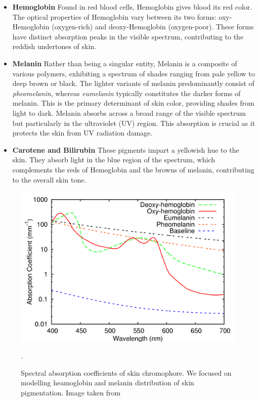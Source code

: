 \begin{spacing}{1.5}
\begin{itemize}
    \item \textbf{Hemoglobin} Found in red blood cells, Hemoglobin gives blood its red color. The optical properties of Hemoglobin vary between its two forms: oxy-Hemoglobin (oxygen-rich) and deoxy-Hemoglobin (oxygen-poor). These forms have distinct absorption peaks in the visible spectrum, contributing to the reddish undertones of skin.
    \item \textbf{Melanin} Rather than being a singular entity, Melanin is a composite of various polymers, exhibiting a spectrum of shades ranging from pale yellow to deep brown or black. The lighter variants of melanin predominantly consist of \textit{pheomelanin}, whereas \textit{eumelanin} typically constitutes the darker forms of melanin\cite{alalufEthnicVariationMelanin2002a}. This is the primary determinant of skin color\cite{doiSpectralEstimationHuman2003}, providing shades from light to dark. Melanin absorbs across a broad range of the visible spectrum but particularly in the ultraviolet (UV) region\cite{ANDERSON198113}. This absorption is crucial as it protects the skin from UV radiation damage. 
    \item \textbf{Carotene and Bilirubin} These pigments impart a yellowish hue to the skin. They absorb light in the blue region of the spectrum, which complements the reds of Hemoglobin and the browns of melanin, contributing to the overall skin tone\cite{ANDERSON198113}.
\end{itemize}

\begin{figure}
    \centering
    \includegraphics[width=0.9\columnwidth]{Chapter2/HM_abs.png}
    \caption{Spectral absorption coefficients of skin chromophore. We focused on modelling heamoglobin and melanin distribution of skin pigmentation. Image taken from\cite{10.5555/2383894.2383946}}.
    \label{fig:hm_abs}
\end{figure}


\end{spacing}
